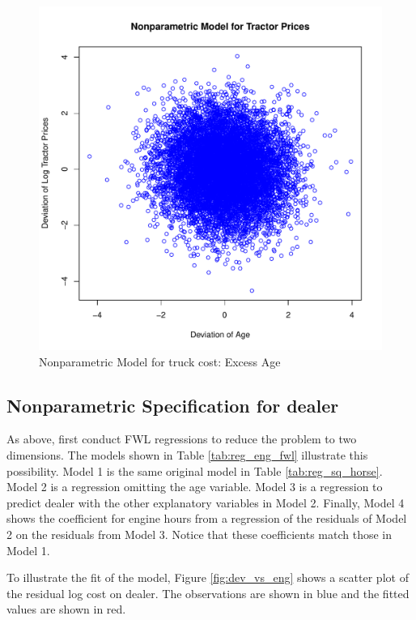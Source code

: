 \documentclass[11pt]{paper}
\begin{document}
\begin{figure}[h!]
  \centering
  \includegraphics[scale = 0.5, keepaspectratio=true]{../Figures/dev_np_vs_age_dev}
  \caption{Nonparametric Model for truck cost: Excess Age} \label{fig:dev_np_vs_age_dev}
\end{figure}





\clearpage
\subsection{Nonparametric Specification for dealer}

As above, first conduct FWL regressions 
to reduce the problem to two dimensions. 
The models shown in
Table \ref{tab:reg_eng_fwl}
illustrate this possibility. 
Model 1 is the same original model in 
Table \ref{tab:reg_sq_horse}. 
Model 2 is a regression omitting the age variable. 
Model 3 is a regression to predict dealer with the other explanatory variables in Model 2.
Finally, Model 4 shows the coefficient for engine hours
from a regression of the residuals of Model 2
on the residuals from Model 3. 
Notice that these coefficients match those in Model 1. 



\pagebreak 
To illustrate the fit of the model, 
Figure \ref{fig:dev_vs_eng} shows a scatter plot 
of the residual log cost on dealer. 
The observations are shown in blue
and the fitted values are shown in red.
 
\end{document}
